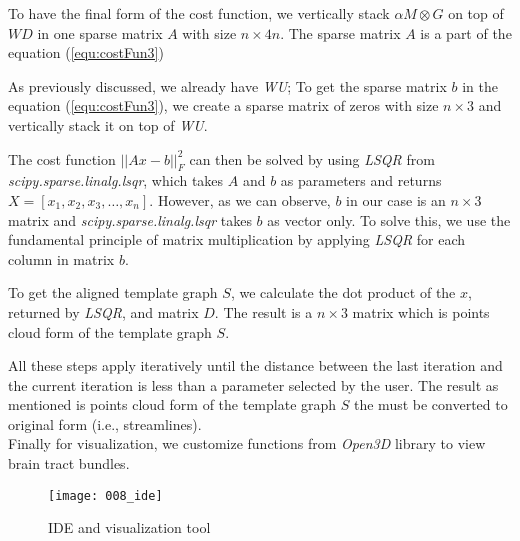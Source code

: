 \documentclass[../structure.tex]{subfiles}
\begin{document}
To have the final form of the cost function, we vertically stack $\alpha M \otimes G$ on top of $WD$ in one sparse matrix $A$ with size $n\times 4n$.  The sparse matrix $A$ is a part of the equation (\ref{equ:costFun3})

As previously discussed, we already have \textit{WU}; To get the sparse matrix $b$ in the equation (\ref{equ:costFun3}), we create a sparse matrix of zeros with size $n\times 3$ and vertically stack it on top of \textit{WU}.

The cost function $||Ax-b||_{F}^2$ can then be solved by using \textit{LSQR} from \textit{scipy.sparse.linalg.lsqr}, which takes $A$ and $b$ as parameters and returns $X=[x_{1}, x_{2}, x_{3}, \dots, x_{n}]$. However, as we can observe, $b$ in our case is an $n\times 3$ matrix and \textit{scipy.sparse.linalg.lsqr} takes $b$ as vector only. To solve this, we use the fundamental principle of matrix multiplication by applying \textit{LSQR} for each column in matrix $b$.

To get the aligned template graph $S$, we calculate the dot product of the $x$, returned by \textit{LSQR}, and matrix $D$. The result is a $n\times 3$ matrix which is points cloud form of the template graph $S$.

All these steps apply iteratively until the distance between the last iteration and the current iteration is less than a parameter selected by the user. The result as mentioned is points cloud form of the template graph $S$ the must be converted to original form (i.e., streamlines).\\

Finally for visualization, we customize functions from \textit{Open3D} \cite{Zhou2018} library to view brain tract bundles.

\begin{figure}[h!]
\centering
\texttt{[image: 008\_ide]}
\captionsetup{justification=centering}
\caption{IDE and visualization tool}
\end{figure}
\end{document}
